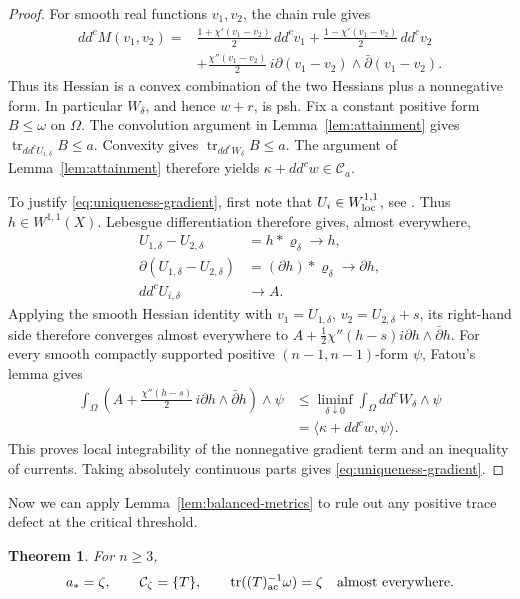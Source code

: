 \documentclass[reqno]{amsart}
\numberwithin{equation}{section}
\newtheorem{theorem}{Theorem}[section]
\theoremstyle{definition}
\DeclareMathOperator{\tr}{tr}
\begin{document}
\begin{proof}
For smooth real functions $v_1,v_2$, the chain rule gives
\[
\begin{aligned}
dd^cM(v_1,v_2)
={}&\frac{1+\chi'(v_1-v_2)}2\,dd^cv_1
 +\frac{1-\chi'(v_1-v_2)}2\,dd^cv_2\\
&+\frac{\chi''(v_1-v_2)}2\,
 i\partial(v_1-v_2)\wedge\bar\partial(v_1-v_2).
\end{aligned}
\]
Thus its Hessian is a convex combination of the two Hessians plus
a nonnegative form. In particular $W_\delta$, and hence $w+r$,
is psh. Fix a constant positive form $B\le\omega$ on $\Omega$.
The convolution argument in Lemma~\ref{lem:attainment}
gives
$\tr_{dd^cU_{i,\delta}}B\le a$.
Convexity  gives $\tr_{dd^cW_\delta}B\le a$.
The argument of Lemma~\ref{lem:attainment} therefore yields
$\kappa+dd^cw\in\mathcal C_a$.

To justify \eqref{eq:uniqueness-gradient}, first note
that $U_i\in W^{1,1}_{\rm loc}$, see \cite[Theorem 1.48]{GZ17}.
 Thus $h\in W^{1,1}(X)$.
 Lebesgue
differentiation therefore gives, almost everywhere,
\[
\begin{aligned}
U_{1,\delta}-U_{2,\delta}
   &=h*\varrho_\delta\longrightarrow h,\\
\partial(U_{1,\delta}-U_{2,\delta})
   &=(\partial h)*\varrho_\delta\longrightarrow\partial h,\\
dd^cU_{i,\delta}&\longrightarrow A.
\end{aligned}
\]
Applying the smooth Hessian identity with
$v_1=U_{1,\delta}$, $v_2=U_{2,\delta}+s$, its right-hand side
therefore converges almost everywhere to
$A+\frac12\chi''(h-s)i\partial h\wedge\bar\partial h$.
For every smooth compactly supported positive $(n-1,n-1)$-form
$\psi$, Fatou's lemma gives
\[
\begin{aligned}
\int_\Omega
 \left(A+\frac{\chi''(h-s)}2\,i\partial h\wedge\bar\partial h\right)
 \wedge\psi
&\le\liminf_{\delta\downarrow0}
 \int_\Omega dd^cW_\delta\wedge\psi\\
&=\langle\kappa+dd^cw,\psi\rangle.
\end{aligned}
\]
This proves local integrability of the nonnegative gradient term and
an inequality of currents. Taking absolutely continuous parts gives
\eqref{eq:uniqueness-gradient}.
\end{proof}

Now we can apply Lemma~\ref{lem:balanced-metrics} to rule out any positive trace defect at the critical threshold.
\begin{theorem}\label{thm:rigidity}
For $n\ge3$,
\begin{equation}\label{eq:critical-equation}
a_*=\zeta,\qquad \mathcal C_\zeta=\{T\},\qquad
\tr((T)_{\rm ac}^{-1}\omega)=\zeta
\quad\hbox{almost everywhere}.
\end{equation}
\end{theorem}
\end{document}
